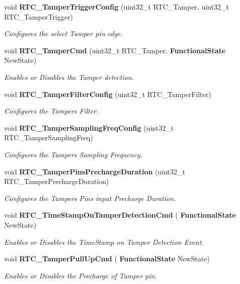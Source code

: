 \begin{DoxyCompactItemize}
void \textbf{ R\+T\+C\+\_\+\+Tamper\+Trigger\+Config} (uint32\+\_\+t R\+T\+C\+\_\+\+Tamper, uint32\+\_\+t R\+T\+C\+\_\+\+Tamper\+Trigger)
\begin{DoxyCompactList}\small\item\em Configures the select Tamper pin edge. \end{DoxyCompactList}\item 
void \textbf{ R\+T\+C\+\_\+\+Tamper\+Cmd} (uint32\+\_\+t R\+T\+C\+\_\+\+Tamper, \textbf{ Functional\+State} New\+State)
\begin{DoxyCompactList}\small\item\em Enables or Disables the Tamper detection. \end{DoxyCompactList}\item 
void \textbf{ R\+T\+C\+\_\+\+Tamper\+Filter\+Config} (uint32\+\_\+t R\+T\+C\+\_\+\+Tamper\+Filter)
\begin{DoxyCompactList}\small\item\em Configures the Tampers Filter. \end{DoxyCompactList}\item 
void \textbf{ R\+T\+C\+\_\+\+Tamper\+Sampling\+Freq\+Config} (uint32\+\_\+t R\+T\+C\+\_\+\+Tamper\+Sampling\+Freq)
\begin{DoxyCompactList}\small\item\em Configures the Tampers Sampling Frequency. \end{DoxyCompactList}\item 
void \textbf{ R\+T\+C\+\_\+\+Tamper\+Pins\+Precharge\+Duration} (uint32\+\_\+t R\+T\+C\+\_\+\+Tamper\+Precharge\+Duration)
\begin{DoxyCompactList}\small\item\em Configures the Tampers Pins input Precharge Duration. \end{DoxyCompactList}\item 
void \textbf{ R\+T\+C\+\_\+\+Time\+Stamp\+On\+Tamper\+Detection\+Cmd} (\textbf{ Functional\+State} New\+State)
\begin{DoxyCompactList}\small\item\em Enables or Disables the Time\+Stamp on Tamper Detection Event. \end{DoxyCompactList}\item 
void \textbf{ R\+T\+C\+\_\+\+Tamper\+Pull\+Up\+Cmd} (\textbf{ Functional\+State} New\+State)
\begin{DoxyCompactList}\small\item\em Enables or Disables the Precharge of Tamper pin. \end{DoxyCompactList}\item 

\end{DoxyCompactItemize}
